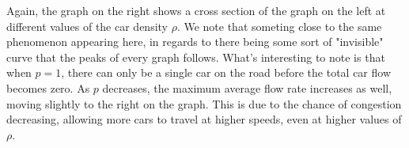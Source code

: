 \documentclass[a4paper,12pt]{article}
\begin{document}
Again, the graph on the right shows a cross section of the graph on the left at different values of the car density
$\rho$. We note that someting close to the same phenomenon appearing here, in regards to there being some sort of
"invisible" curve that the peaks of every graph follows. What's interesting to note is that when $p = 1$, there can
only be a single car on the road before the total car flow becomes zero. As $p$ decreases, the maximum average flow
rate increases as well, moving slightly to the right on the graph. This is due to the chance of congestion decreasing,
allowing more cars to travel at higher speeds, even at higher values of $\rho$.
\end{document}
